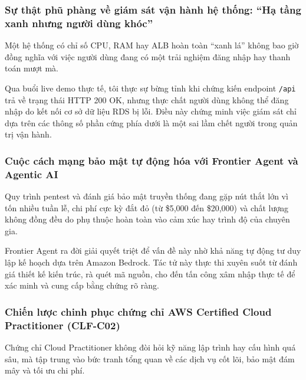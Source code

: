 \hypertarget{sux1ef1-thux1eadt-phux169-phuxe0ng-vux1ec1-giuxe1m-suxe1t-vux1eadn-huxe0nh-hux1ec7-thux1ed1ng-hux1ea1-tux1ea7ng-xanh-nhux1b0ng-ngux1b0ux1eddi-duxf9ng-khuxf3c}{%
\subsubsection{Sự thật phũ phàng về giám sát vận hành hệ thống: ``Hạ
tầng xanh nhưng người dùng
khóc''}}

Một hệ thống có chỉ số CPU, RAM hay ALB hoàn toàn ``xanh lá'' không bao
giờ đồng nghĩa với việc người dùng đang có một trải nghiệm đăng nhập hay
thanh toán mượt mà.

Qua buổi live demo thực tế, tôi thực sự bừng tỉnh khi chứng kiến
endpoint \texttt{/api} trả về trạng thái HTTP 200 OK, nhưng thực chất
người dùng không thể đăng nhập do kết nối cơ sở dữ liệu RDS bị lỗi. Điều
này chứng minh việc giám sát chỉ dựa trên các thông số phần cứng phía
dưới là một sai lầm chết người trong quản trị vận hành.

\hypertarget{cuux1ed9c-cuxe1ch-mux1ea1ng-bux1ea3o-mux1eadt-tux1ef1-ux111ux1ed9ng-huxf3a-vux1edbi-frontier-agent-vuxe0-agentic-ai}{%
\subsubsection{Cuộc cách mạng bảo mật tự động hóa với Frontier Agent và
Agentic
AI}}

Quy trình pentest và đánh giá bảo mật truyền thống đang gặp nút thắt lớn
vì tốn nhiều tuần lễ, chi phí cực kỳ đắt đỏ (từ \$5,000 đến \$20,000) và
chất lượng không đồng đều do phụ thuộc hoàn toàn vào cảm xúc hay trình
độ của chuyên gia.

Frontier Agent ra đời giải quyết triệt để vấn đề này nhờ khả năng tự
động tư duy lập kế hoạch dựa trên Amazon Bedrock. Tác tử này thực thi
xuyên suốt từ đánh giá thiết kế kiến trúc, rà quét mã nguồn, cho đến tấn
công xâm nhập thực tế để xác minh và cung cấp bằng chứng rõ ràng.

\hypertarget{chiux1ebfn-lux1b0ux1ee3c-chinh-phux1ee5c-chux1ee9ng-chux1ec9-aws-certified-cloud-practitioner-clf-c02}{%
\subsubsection{Chiến lược chinh phục chứng chỉ AWS Certified Cloud
Practitioner
(CLF-C02)}}

Chứng chỉ Cloud Practitioner không đòi hỏi kỹ năng lập trình hay cấu
hình quá sâu, mà tập trung vào bức tranh tổng quan về các dịch vụ cốt
lõi, bảo mật đám mây và tối ưu chi phí.

